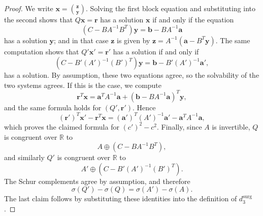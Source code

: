 \documentclass[10pt,a4paper]{amsart}
\begin{document}
\begin{proof}
We write \(\boldsymbol x=\binom{\boldsymbol z}{\boldsymbol y}\). Solving the first block equation and substituting into the second shows that \(Q\boldsymbol x=\boldsymbol r\) has a solution $\boldsymbol{x}$ if and only if the equation
\[
(C-BA^{-1}B^T)\boldsymbol y
=
\boldsymbol b-BA^{-1}\boldsymbol a
\]
has a solution $\boldsymbol{y}$; and in that case $\boldsymbol{z}$ is given by $\boldsymbol z=A^{-1}(\boldsymbol a-B^T\boldsymbol y)$.
The same computation shows that \(Q'\boldsymbol x'=\boldsymbol r'\) has a solution if and only if 
\[
(C-B'(A')^{-1}(B')^T)\boldsymbol y
=
\boldsymbol b-B'(A')^{-1}\boldsymbol a',
\]
has a solution. By assumption, these two equations agree, so the solvability of the two systems agrees.
If this is the case, we compute
\[
\boldsymbol r^T\boldsymbol x
=
\boldsymbol a^TA^{-1}\boldsymbol a
+
(\boldsymbol b-BA^{-1}\boldsymbol a)^T\boldsymbol y,
\]
and the same formula holds for \((Q',\boldsymbol r')\). Hence
\[
(\boldsymbol r')^T\boldsymbol x' - \boldsymbol r^T\boldsymbol x
=
(\boldsymbol a')^T(A')^{-1}\boldsymbol a'
-
\boldsymbol a^TA^{-1}\boldsymbol a,
\]
which proves the claimed formula for \((c')^2-c^2\).
Finally, since \(A\) is invertible, \(Q\) is congruent over \(\mathbb R\) to
\[
A\oplus(C-BA^{-1}B^T),
\]
and similarly \(Q'\) is congruent over \(\mathbb R\) to
\[
A'\oplus(C-B'(A')^{-1}(B')^T).
\]
The Schur complements agree by assumption, and therefore
\[
\sigma(Q')-\sigma(Q)=\sigma(A')-\sigma(A).
\]
The last claim follows by substituting these identities into the definition of \(d_3^{\mathrm{surg}}\).
\end{proof}
\end{document}
